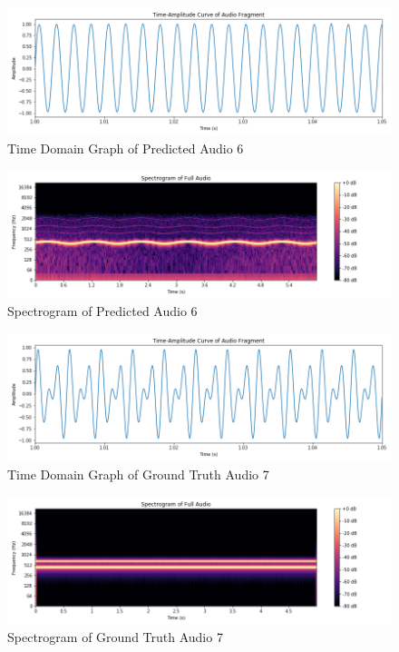 \documentclass{ioereport}
\begin{document}
    \begin{figure}[H]
        \centering
        \includegraphics[width=\linewidth]{assets/audio_results/Predfluctuating_tone400time.png}
        \caption{Time Domain Graph of Predicted Audio 6}
        \label{fig:pred-fluctuating-time}
    \end{figure}
    \begin{figure}[H]
        \centering
        \includegraphics[width=\linewidth]{assets/audio_results/Predfluctuating_tone400spec.png}
        \caption{Spectrogram of Predicted Audio 6}
        \label{fig:pred-fluctuatung-spec}
    \end{figure}



    \begin{figure}[H]
        \centering
        \includegraphics[width=\linewidth]{assets/audio_results/multitoneA4E4time.png}
        \caption{Time Domain Graph of Ground Truth Audio 7}
        \label{fig:gt-multitonea4e4-time}
    \end{figure}
    \begin{figure}[H]
        \centering
        \includegraphics[width=\linewidth]{assets/audio_results/multitoneA4E4spec.png}
        \caption{Spectrogram of Ground Truth Audio 7}
        \label{fig:gt-multitonea4e4-spec}
    \end{figure}
    
\end{document}
